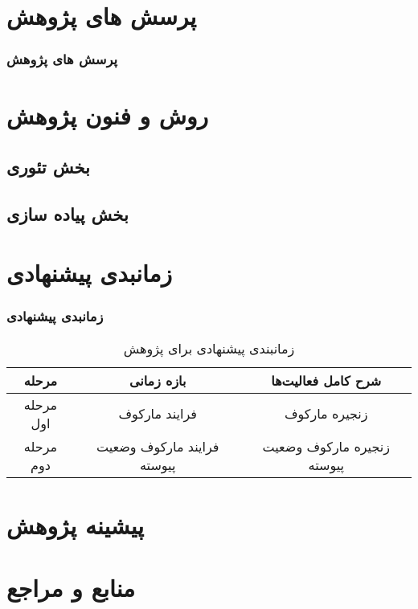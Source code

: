 \documentclass[xcolor=dvipsnames, professionalfonts, aspectratio=169, 11pt]{beamer}
\begin{document}
\section{پرسش های پژوهش}
\begin{frame}
    \frametitle{پرسش های پژوهش}
    
\end{frame}

\section{روش و فنون پژوهش}
\subsection{بخش تئوری}
\subsection{بخش پیاده سازی}

\section{زمانبدی پیشنهادی}
\begin{frame}
    \frametitle{زمانبدی پیشنهادی}
    \begin{table}
        \caption{زمانبندی پیشنهادی برای پژوهش}
        \vspace{-1em}
        \small
        \begin{tabular}{|c|c|c|}
            \hline
            \textbf{مرحله}       & \textbf{بازه زمانی}       & \textbf{شرح کامل فعالیت‌ها}        \\
            \hline
            مرحله اول  & فرایند مارکوف              & زنجیره مارکوف              \\
            \hline
            مرحله دوم & فرایند مارکوف وضعیت پیوسته & زنجیره مارکوف وضعیت پیوسته \\
            \hline
        \end{tabular}
    \end{table}
\end{frame}

\section{پیشینه پژوهش}

\section{منابع و مراجع}
\begin{frame}
    \begin{latin}
        \scriptsize
        
    \end{latin}

\end{frame}
\end{document}
